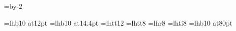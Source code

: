 
\def\today{\number\year-\twodigits=\month \printtwodigits-\twodigits=\day \printtwodigits}
\newcount\twodigits
\def\hours{\twodigits=\time \divide\twodigits by 60 \printtwodigits
  \multiply\twodigits by-60 \advance\twodigits by\time :\printtwodigits}
\def\gobbleone1{}
\def\printtwodigits{\advance\twodigits100
  \expandafter\gobbleone\number\twodigits
  \advance\twodigits-100 }

\newcount\ttlineno
\def\Blue{} %
\def\Red{} %
\def\Brown{} %
\def\Green{} %
\def\Yellow{} %
\def\Black{} %
\let\oriBlack=\Black %


          \def\titmodule{Modul}
          \def\tittoc{Obsah}
          \def\titindex{Rejstrik}
          \def\opartname{>> CAST}

\def\titversion{}
\def\projectversion{\today\ \hours}



\def\begtthook{}
\def\quotehook{}
\def\indexhook{}
\def\tochook{}
\def\bookmarkshook{}
\def\outputhook{}


\parindent=30pt

\newdimen\nwidth \nwidth=\hsize \advance\nwidth by-2\parindent

\raggedbottom
{}

\font\bbf=lhb10 at12pt
\font\bbbf=lhb10 at14.4pt
\font\btt=lhtt12
\font\ttsmall=lhtt8
\font\rmsmall=lhr8
\font\itsmall=lhti8
\font\partfont=lhb10 at80pt

\def\setsmallprinting{\ttsmall \let\it=\itsmall \let\rm=\rmsmall 
   \def\ttstrut{\vrule height8pt depth3pt width0pt}%
   \offinterlineskip \parskip=-1pt\relax
}
\def\setnormalprinting{\tt \baselineskip=0pt \hfuzz=4em 
   \def\ttstrut{\vrule height10pt depth3pt width0pt}%
   \offinterlineskip \parskip=-1pt\relax
}

   \def\rectangle#1#2#3#4{\vbox to0pt{\vss\hrule\kern-.3pt
      \hbox to#3{\vrule height#1 depth#2\hss#4\hss\vrule}%
      \kern-.3pt\hrule\kern-#2\kern-.1pt}}

